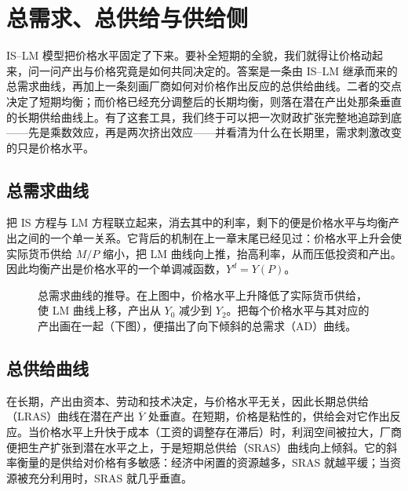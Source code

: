 \chapter{总需求、总供给与供给侧}
\label{ch:adas}

IS--LM 模型把价格水平固定了下来。要补全短期的全貌，我们就得让价格动起来，问一问产出与价格究竟是如何共同决定的。答案是一条由 IS--LM 继承而来的总需求曲线，再加上一条刻画厂商如何对价格作出反应的总供给曲线。二者的交点决定了短期均衡；而价格已经充分调整后的长期均衡，则落在潜在产出处那条垂直的长期供给曲线上。有了这套工具，我们终于可以把一次财政扩张完整地追踪到底——先是乘数效应，再是两次挤出效应——并看清为什么在长期里，需求刺激改变的只是价格水平。

\section{总需求曲线}

把 IS 方程与 LM 方程联立起来，消去其中的利率，剩下的便是价格水平与均衡产出之间的一个单一关系。它背后的机制在上一章末尾已经见过：价格水平上升会使实际货币供给 $M/P$ 缩小，把 LM 曲线向上推，抬高利率，从而压低投资和产出。因此均衡产出是价格水平的一个单调减函数，$Y^{d}=Y(P)$。

\begin{figure}[h]
\centering

\caption{总需求曲线的推导。在上图中，价格水平上升降低了实际货币供给，使 LM 曲线上移，产出从 $Y_0$ 减少到 $Y_2$。把每个价格水平与其对应的产出画在一起（下图），便描出了向下倾斜的总需求（AD）曲线。}
\label{fig:macro-25}
\end{figure}



\section{总供给曲线}

在长期，产出由资本、劳动和技术决定，与价格水平无关，因此长期总供给（LRAS）曲线在潜在产出 $\overline{Y}$ 处垂直。在短期，价格是粘性的，供给会对它作出反应。当价格水平上升快于成本（工资的调整存在滞后）时，利润空间被拉大，厂商便把生产扩张到潜在水平之上，于是短期总供给（SRAS）曲线向上倾斜。它的斜率衡量的是供给对价格有多敏感：经济中闲置的资源越多，SRAS 就越平缓；当资源被充分利用时，SRAS 就几乎垂直。

